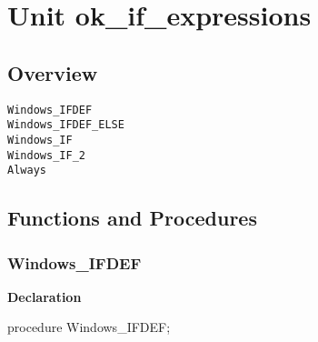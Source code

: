 \documentclass{report}
\newif\ifpdf
\begin{document}
\label{toc}\tableofcontents
\newpage
\newlength{\tmplength}
\chapter{Unit ok{\_}if{\_}expressions}
\label{ok_if_expressions}
\section{Overview}
\begin{description}
\item[\texttt{Windows{\_}IFDEF}]
\item[\texttt{Windows{\_}IFDEF{\_}ELSE}]
\item[\texttt{Windows{\_}IF}]
\item[\texttt{Windows{\_}IF{\_}2}]
\item[\texttt{Always}]
\end{description}
\section{Functions and Procedures}
\ifpdf
\subsection*{\large{\textbf{Windows{\_}IFDEF}}\normalsize\hspace{1ex}\hrulefill}
\else
\subsection*{Windows{\_}IFDEF}
\fi
\label{ok_if_expressions-Windows_IFDEF}
\begin{list}{}{
\setlength{\itemindent}{0cm}
\setlength{\listparindent}{0cm}
\setlength{\leftmargin}{\evensidemargin}
\addtolength{\leftmargin}{\tmplength}
\settowidth{\labelsep}{X}
\addtolength{\leftmargin}{\labelsep}
\setlength{\labelwidth}{\tmplength}
}
\item[\textbf{Declaration}\hfill]
\ifpdf
\begin{flushleft}
\fi
\begin{ttfamily}
procedure Windows{\_}IFDEF;\end{ttfamily}

\ifpdf
\end{flushleft}
\fi

\end{list}
\ifpdf
\end{document}
